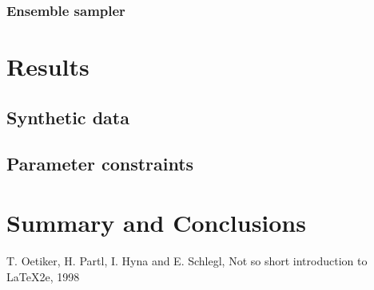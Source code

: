\documentclass{wihuri}
\begin{document}
\subsubsection{Ensemble sampler}

\section{Results}

\subsection{Synthetic data}

\subsection{Parameter constraints}

\section{Summary and Conclusions}










\iffalse
\begin{figure}
\begin{center}
\setlength{\unitlength}{1cm}
\begin{picture}(6,6)(-3,-3)
\put(-1.5,0){\vector(1,0){3}}
\put(2.7,-0.1){$\chi$}
\put(0,-1.5){\vector(0,1){3}}
\multiput(-2.5,1)(0.4,0){13}
{\line(1,0){0.2}}
\multiput(-2.5,-1)(0.4,0){13}
{\line(1,0){0.2}}
\put(0.2,1.4)
{$\beta=v/c=\tanh\chi$}
\qbezier(0,0)(0.8853,0.8853)
(2,0.9640)
\qbezier(0,0)(-0.8853,-0.8853)
(-2,-0.9640)
\end{picture}
\caption{Tässä on hieno kuva}
\label{kuva1}
\end{center}
\end{figure}
\fi


\newpage
\renewcommand{\baselinestretch}{1}\large\normalsize
%
\begin{thebibliography}{50}%
 T. Oetiker, H. Partl, I. Hyna and E. Schlegl,
Not so short introduction to \LaTeX 2e, 1998
\end{thebibliography}
%
%
%
%
%
%
\end{document}
